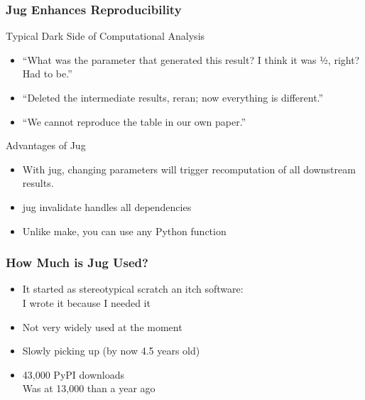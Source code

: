 \documentclass{beamer}
\begin{document}
\begin{frame}[fragile]
\frametitle{Jug Enhances Reproducibility}

\begin{block}{Typical \alert{Dark Side} of Computational Analysis}
\begin{itemize}
\item ``What was the parameter that generated this result? I think it was ½, right? Had to be.''
\item ``Deleted the intermediate results, reran; now everything is different.''
\item ``We cannot reproduce the table in our own paper.''
\end{itemize}
\end{block}

\begin{block}{Advantages of Jug}


\begin{itemize}
\item With jug, changing parameters \alert{will trigger recomputation of all
downstream results}.
\item \alert{jug invalidate} handles all dependencies
\item Unlike \alert{make}, you can use any Python function
\end{itemize}

\end{block}

\end{frame}
\begin{frame}[fragile]
\frametitle{How Much is Jug Used?}

\begin{itemize}
\item It started as stereotypical \alert{scratch an itch} software:\\
    I wrote it because I needed it
\item Not very widely used at the moment
\item Slowly picking up (by now 4.5 years old)
\item 43,000 PyPI downloads\\
    \alert{Was at 13,000 than a year ago}
\end{itemize}

\end{frame}
\end{document}

